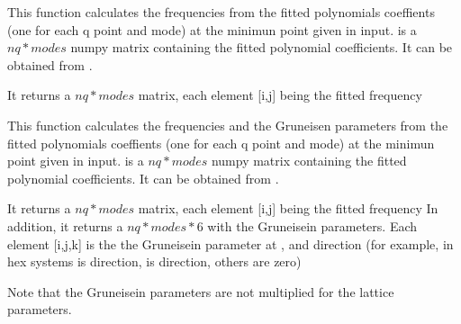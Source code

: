 \documentclass[letterpaper,10pt,english]{sphinxmanual}
\begin{document}
\begin{fulllineitems}
\label{pyqha:pyqha.fitfreqgrun.freqmin}
This function calculates the frequencies from the fitted polynomials coeffients (one
for each q point and mode) at the minimun point  given in input. 
 is a \(nq*modes\) numpy matrix containing the fitted polynomial coefficients.
It can be obtained from {\hyperref[pyqha:pyqha.fitfreqgrun.fitfreqxx]{}}.

It returns a \(nq*modes\) matrix, each element {[}i,j{]} being the fitted frequency

\end{fulllineitems}


\begin{fulllineitems}
\label{pyqha:pyqha.fitfreqgrun.freqmingrun}
This function calculates the frequencies and the Gruneisen parameters
from the fitted polynomials coeffients (one
for each q point and mode) at the minimun point  given in input. 
 is a \(nq*modes\) numpy matrix containing the fitted polynomial coefficients.
It can be obtained from {\hyperref[pyqha:pyqha.fitfreqgrun.fitfreqxx]{}}.

It returns a \(nq*modes\) matrix, each element {[}i,j{]} being the fitted frequency 
In addition, it returns a \(nq*modes*6\) with the Gruneisein parameters.
Each element {[}i,j,k{]} is the the Gruneisein parameter at ,  and direction
 (for example, in hex systems  is  direction,  is  direction, others are zero)

Note that the Gruneisein parameters are not multiplied for the lattice parameters.

\end{fulllineitems}

\end{document}
